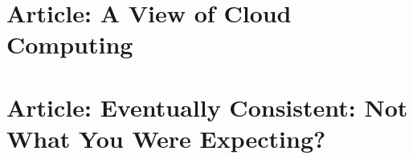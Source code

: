 \documentclass[11pt]{article}
\begin{document}
\section{Article: A View of Cloud Computing}


\section{Article: Eventually Consistent: Not What You Were Expecting?}






%

%

%
\end{document}
